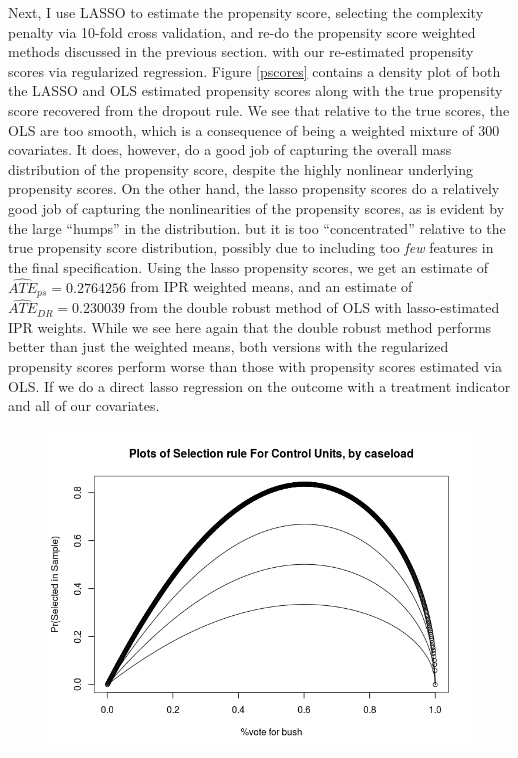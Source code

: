\documentclass{article}
\begin{document}
Next, I use LASSO to estimate the propensity score, selecting the complexity penalty via 10-fold cross validation, and re-do the propensity score weighted methods discussed in the previous section. with our re-estimated propensity scores via regularized regression. Figure \ref{pscores} contains a density plot of both the LASSO and OLS estimated propensity scores along with the true propensity score recovered from the dropout rule. We see that relative to the true scores, the OLS are too smooth, which is a consequence of being a weighted mixture of 300 covariates. It does, however, do a good job of capturing the overall mass distribution of the propensity score, despite the highly nonlinear underlying propensity scores. On the other hand, the lasso propensity scores do a relatively good job of capturing the nonlinearities of the propensity scores, as is evident by the large ``humps'' in the distribution. but it is too ``concentrated'' relative to the true propensity score distribution, possibly due to including too \textit{few} features in the final specification. Using the lasso propensity scores, we get an estimate of  $\widehat{ATE}_{ps}=0.2764256$ from IPR weighted means, and an estimate of $\widehat{ATE}_{DR} = 0.230039$ from the double robust method of OLS with lasso-estimated IPR weights. While we see here again that the double robust method performs better than just the weighted means, both versions with the regularized propensity scores perform worse than those with propensity scores estimated via OLS. If we do a direct lasso regression on the outcome with a treatment indicator and all of our covariates.




\begin{figure}
\label{dt}
\center
\includegraphics[scale=1]{select_c.png}
\end{figure}
\end{document}

